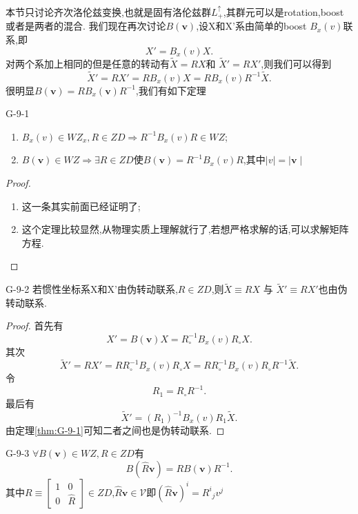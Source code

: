 \documentclass[../main.tex]{subfiles}
\begin{document}
本节只讨论齐次洛伦兹变换,也就是固有洛伦兹群$L^\uparrow_+$,其群元可以是rotation,boost或者是两者的混合.
我们现在再次讨论$B(\bm{v})$,设X和X'系由简单的boost $B_x(v)$联系,即\[
	X' = B_x(v)X
	.\]
对两个系加上相同的但是任意的转动有$\tilde{X} = R X$和 $\tilde{X}' = R X'$,则我们可以得到
\[ \tilde{X}' = RX' = RB_x(v)X = R B_x(v) R^{-1}\tilde{X}
	.\]
很明显$B(\bm{v}) = R B_x(\bm{v}) R^{-1}$,我们有如下定理
\begin{theorem}{}{G-9-1}
	\begin{enumerate}
		\item $B_x(v) \in WZ_x, R\in ZD \Rightarrow R^{-1} B_x(v)R\in WZ$;
		\item $B(\bm{v}) \in WZ \Rightarrow \exists  R \in  ZD$使$B(\bm{v}) = R^{-1}B_x(v) R$,其中$  \mid v  \mid =  \mid \bm{v} \mid $
	\end{enumerate}
\end{theorem}
\begin{proof}
	\begin{enumerate}
		\item 这一条其实前面已经证明了;
		\item 这个定理比较显然,从物理实质上理解就行了,若想严格求解的话,可以求解矩阵方程.
	\end{enumerate}
\end{proof}
\begin{theorem}{}{G-9-2}
	若惯性坐标系X和X'由伪转动联系,$R\in ZD$,则$\tilde{X} \equiv RX$ 与 $\tilde{X}' \equiv R X'$也由伪转动联系.
\end{theorem}
\begin{proof}
	首先有  \[
		X' = B(\bm{v})X = R_{\circ}^{-1} B_x(v) R_{\circ} X
		.\]
	其次\[
		\tilde{X}' = RX'=RR_{\circ}^{-1} B_x(v) R_{\circ} X =R R_{\circ}^{-1} B_x(v) R_{\circ} R^{-1}\tilde{X}
		.\]
	令\[
		R_1 = R_{\circ} R^{-1}
		.\]
	最后有\[
		\tilde{X}' = (R_1)^{-1} B_x(v) R_1\tilde{X}
		.\]
	由定理\ref{thm:G-9-1}可知二者之间也是伪转动联系.
\end{proof}
\begin{theorem}{}{G-9-3}
	$\forall B(\bm{v}) \in WZ, R \in ZD$有\[
		B(\hat{R}\bm{v}) = RB(\bm{v})R^{-1}
		.\]
	其中$R \equiv \begin{bmatrix} 1&0\\ 0&\hat{R} \end{bmatrix} \in  ZD$,$\hat{R}\bm{v}\in \mathscr{V}$即$(\hat{R}\bm{v})^i = R^i{}_{j}v^j$
\end{theorem}
\end{document}
